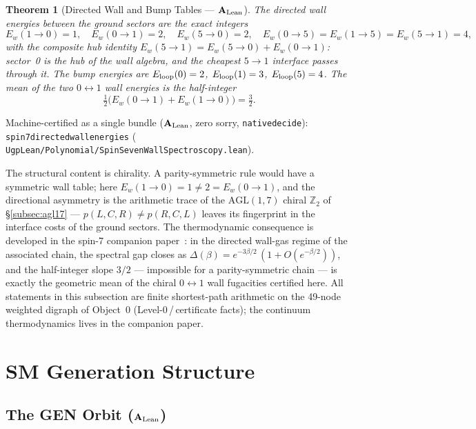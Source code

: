 \documentclass[11pt]{article}
\newtheorem{theorem}{Theorem}[section]
\theoremstyle{remark}
\newcommand{\lean}[1]{%
  \penalty-100
  \begingroup\def\_{\textunderscore\allowbreak}\texttt{#1}\endgroup}
\newcommand{\CatAL}{\texorpdfstring{\ensuremath{\textbf{A}_{\rm Lean}}}{A-Lean}}
\begin{document}
\begin{theorem}[Directed Wall and Bump Tables --- \CatAL{}]
\label{thm:wallspectroscopy}
The directed wall energies between the ground sectors are the exact
integers
\[
  E_w(1{\to}0) = 1,\quad E_w(0{\to}1) = 2,\quad E_w(5{\to}0) = 2,\quad
  E_w(0{\to}5) = E_w(1{\to}5) = E_w(5{\to}1) = 4,
\]
with the composite hub identity
$E_w(5{\to}1) = E_w(5{\to}0) + E_w(0{\to}1)$: sector~0 is the hub of the
wall algebra, and the cheapest $5 \to 1$ interface passes through it. The
bump energies are $E_{\rm loop}(0) = 2$, $E_{\rm loop}(1) = 3$,
$E_{\rm loop}(5) = 4$. The mean of the two $0 \leftrightarrow 1$ wall
energies is the half-integer
\[
  \tfrac{1}{2}\bigl(E_w(0{\to}1) + E_w(1{\to}0)\bigr) = \tfrac{3}{2}.
\]
\end{theorem}

Machine-certified as a single bundle (\CatAL{}, zero sorry,
\lean{native\_decide}): \lean{spin7\_directed\_wall\_energies}
(\lean{UgpLean/Polynomial/SpinSevenWallSpectroscopy.lean}).

The structural content is chirality. A parity-symmetric rule would have a
symmetric wall table; here $E_w(1{\to}0) = 1 \neq 2 = E_w(0{\to}1)$, and
the directional asymmetry is the arithmetic trace of the
$\mathrm{AGL}(1,7)$ chiral $\mathbb{Z}_2$ of §\ref{subsec:agl17} ---
$p(L,C,R) \neq p(R,C,L)$ leaves its fingerprint in the interface costs of
the ground sectors. The thermodynamic consequence is developed in the
spin-7 companion paper~\cite{SpivackSpin7Lattice}: in the directed
wall-gas regime of the associated chain, the spectral gap closes as
$\Delta(\beta) = e^{-3\beta/2}\,(1 + O(e^{-\beta/2}))$, and the
half-integer slope $3/2$ --- impossible for a parity-symmetric chain ---
is exactly the geometric mean of the chiral $0 \leftrightarrow 1$ wall
fugacities certified here. All statements in this subsection are
finite shortest-path arithmetic on the 49-node weighted digraph of
Object~0 (Level-0\,/\,certificate facts); the continuum thermodynamics
lives in the companion paper.

\section{SM Generation Structure}
\label{sec:sm}

\subsection{The GEN Orbit (\CatAL{})}
\end{document}
